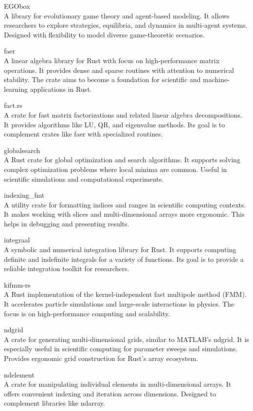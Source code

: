 \documentclass{article}
\begin{document}
EGObox\\
A library for evolutionary game theory and agent-based modeling. It allows researchers to
explore strategies, equilibria, and dynamics in multi-agent systems. Designed with flexibility to
model diverse game-theoretic scenarios.

faer\\
A linear algebra library for Rust with focus on high-performance matrix operations. It
provides dense and sparse routines with attention to numerical stability. The crate aims to become
a foundation for scientific and machine-learning applications in Rust.

fact.rs\\
A crate for fast matrix factorizations and related linear algebra decompositions. It
provides algorithms like LU, QR, and eigenvalue methods. Its goal is to complement crates like faer
with specialized routines.

globalsearch\\
A Rust crate for global optimization and search algorithms. It supports solving
complex optimization problems where local minima are common. Useful in scientific simulations and
computational experiments.

indexing\_fmt\\
A utility crate for formatting indices and ranges in scientific computing contexts.
It makes working with slices and multi-dimensional arrays more ergonomic. This helps in debugging
and presenting results.

integraal\\
A symbolic and numerical integration library for Rust. It supports computing definite
and indefinite integrals for a variety of functions. Its goal is to provide a reliable integration
toolkit for researchers.

kifmm-rs\\
A Rust implementation of the kernel-independent fast multipole method (FMM). It
accelerates particle simulations and large-scale interactions in physics. The focus is on
high-performance computing and scalability.

ndgrid\\
A crate for generating multi-dimensional grids, similar to MATLAB’s ndgrid. It is
especially useful in scientific computing for parameter sweeps and simulations. Provides ergonomic
grid construction for Rust’s array ecosystem.

ndelement\\
A crate for manipulating individual elements in multi-dimensional arrays. It offers
convenient indexing and iteration across dimensions. Designed to complement libraries like ndarray.
\end{document}
